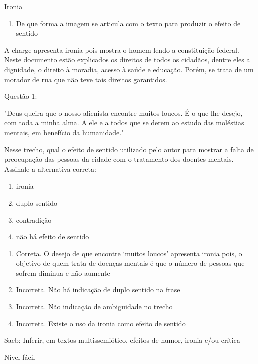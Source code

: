 Ironia

\begin{enumerate}
\def\labelenumi{\arabic{enumi})}
\setcounter{enumi}{9}
\tightlist
\item
  De que forma a imagem se articula com o texto para produzir o efeito
  de sentido
\end{enumerate}

A charge apresenta ironia pois mostra o homem lendo a constituição
federal. Neste documento estão explicados os direitos de todos os
cidadãos, dentre eles a dignidade, o direito à moradia, acesso à saúde e
educação. Porém, se trata de um morador de rua que não teve tais
direitos garantidos.


Questão 1:

"Deus queira que o nosso alienista encontre muitos loucos. É o que lhe
desejo, com toda a minha alma. A ele e a todos que se derem ao estudo
das moléstias mentais, em benefício da humanidade."

Nesse trecho, qual o efeito de sentido utilizado pelo autor para mostrar
a falta de preocupação das pessoas da cidade com o tratamento dos
doentes mentais. Assinale a alternativa correta:

\begin{enumerate}
\def\labelenumi{\alph{enumi})}
\item
  ironia
\item
  duplo sentido
\item
  contradição
\item
  não há efeito de sentido
\end{enumerate}

\begin{enumerate}
\def\labelenumi{\alph{enumi})}
\item
  Correta. O desejo de que encontre `muitos loucos' apresenta ironia
  pois, o objetivo de quem trata de doenças mentais é que o número de
  pessoas que sofrem diminua e não aumente
\item
  Incorreta. Não há indicação de duplo sentido na frase
\item
  Incorreta. Não indicação de ambiguidade no trecho
\item
  Incorreta. Existe o uso da ironia como efeito de sentido
\end{enumerate}

Saeb: Inferir, em textos multissemiótico, efeitos de humor, ironia e/ou
crítica

Nível fácil

